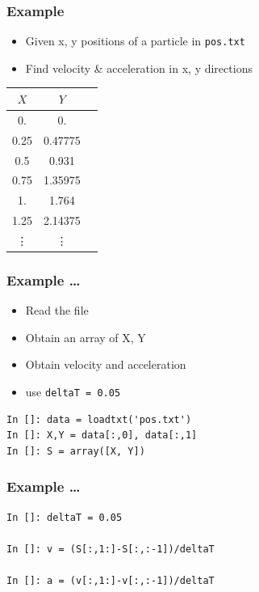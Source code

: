 \documentclass[14pt,compress]{beamer}
\newcommand{\typ}[1]{\lstinline{#1}}
\begin{document}
\begin{frame}[fragile]
\frametitle{Example}
\begin{itemize}
\item Given x, y positions of a particle in \typ{pos.txt}
\item Find velocity \& acceleration in x, y directions
\end{itemize}
\small{
\begin{center}
\begin{tabular}{| c | c | c |}
\hline
$X$ & $Y$ \\ \hline
0.     &  0.\\ \hline
0.25   &  0.47775\\ \hline
0.5    &  0.931\\ \hline
0.75   &  1.35975\\ \hline
1.     &  1.764\\ \hline
1.25   &  2.14375\\ \hline
\vdots & \vdots\\ \hline
\end{tabular}
\end{center}}
\end{frame}

\begin{frame}[fragile]
\frametitle{Example \ldots}
\begin{itemize}
\item Read the file
\item Obtain an array of X, Y
\item Obtain velocity and acceleration
\item use \typ{deltaT = 0.05}
\end{itemize}
\begin{lstlisting}
In []: data = loadtxt('pos.txt')
In []: X,Y = data[:,0], data[:,1]
In []: S = array([X, Y])
\end{lstlisting}
\end{frame}


\begin{frame}[fragile]
\frametitle{Example \ldots}
\begin{lstlisting}
In []: deltaT = 0.05

In []: v = (S[:,1:]-S[:,:-1])/deltaT

In []: a = (v[:,1:]-v[:,:-1])/deltaT
\end{lstlisting}
\end{frame}
\end{document}
